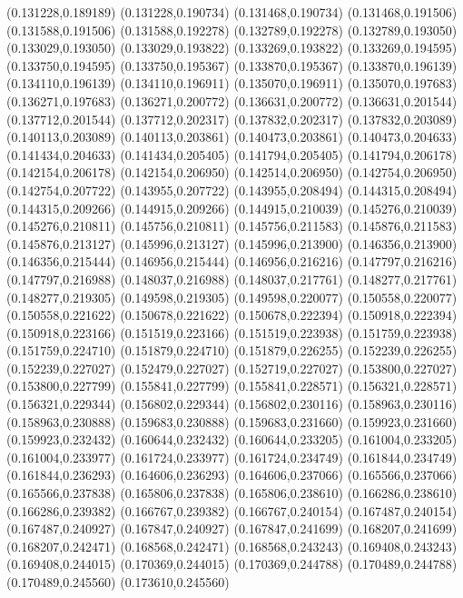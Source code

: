 (0.131228,0.189189)
(0.131228,0.190734)
(0.131468,0.190734)
(0.131468,0.191506)
(0.131588,0.191506)
(0.131588,0.192278)
(0.132789,0.192278)
(0.132789,0.193050)
(0.133029,0.193050)
(0.133029,0.193822)
(0.133269,0.193822)
(0.133269,0.194595)
(0.133750,0.194595)
(0.133750,0.195367)
(0.133870,0.195367)
(0.133870,0.196139)
(0.134110,0.196139)
(0.134110,0.196911)
(0.135070,0.196911)
(0.135070,0.197683)
(0.136271,0.197683)
(0.136271,0.200772)
(0.136631,0.200772)
(0.136631,0.201544)
(0.137712,0.201544)
(0.137712,0.202317)
(0.137832,0.202317)
(0.137832,0.203089)
(0.140113,0.203089)
(0.140113,0.203861)
(0.140473,0.203861)
(0.140473,0.204633)
(0.141434,0.204633)
(0.141434,0.205405)
(0.141794,0.205405)
(0.141794,0.206178)
(0.142154,0.206178)
(0.142154,0.206950)
(0.142514,0.206950)
(0.142754,0.206950)
(0.142754,0.207722)
(0.143955,0.207722)
(0.143955,0.208494)
(0.144315,0.208494)
(0.144315,0.209266)
(0.144915,0.209266)
(0.144915,0.210039)
(0.145276,0.210039)
(0.145276,0.210811)
(0.145756,0.210811)
(0.145756,0.211583)
(0.145876,0.211583)
(0.145876,0.213127)
(0.145996,0.213127)
(0.145996,0.213900)
(0.146356,0.213900)
(0.146356,0.215444)
(0.146956,0.215444)
(0.146956,0.216216)
(0.147797,0.216216)
(0.147797,0.216988)
(0.148037,0.216988)
(0.148037,0.217761)
(0.148277,0.217761)
(0.148277,0.219305)
(0.149598,0.219305)
(0.149598,0.220077)
(0.150558,0.220077)
(0.150558,0.221622)
(0.150678,0.221622)
(0.150678,0.222394)
(0.150918,0.222394)
(0.150918,0.223166)
(0.151519,0.223166)
(0.151519,0.223938)
(0.151759,0.223938)
(0.151759,0.224710)
(0.151879,0.224710)
(0.151879,0.226255)
(0.152239,0.226255)
(0.152239,0.227027)
(0.152479,0.227027)
(0.152719,0.227027)
(0.153800,0.227027)
(0.153800,0.227799)
(0.155841,0.227799)
(0.155841,0.228571)
(0.156321,0.228571)
(0.156321,0.229344)
(0.156802,0.229344)
(0.156802,0.230116)
(0.158963,0.230116)
(0.158963,0.230888)
(0.159683,0.230888)
(0.159683,0.231660)
(0.159923,0.231660)
(0.159923,0.232432)
(0.160644,0.232432)
(0.160644,0.233205)
(0.161004,0.233205)
(0.161004,0.233977)
(0.161724,0.233977)
(0.161724,0.234749)
(0.161844,0.234749)
(0.161844,0.236293)
(0.164606,0.236293)
(0.164606,0.237066)
(0.165566,0.237066)
(0.165566,0.237838)
(0.165806,0.237838)
(0.165806,0.238610)
(0.166286,0.238610)
(0.166286,0.239382)
(0.166767,0.239382)
(0.166767,0.240154)
(0.167487,0.240154)
(0.167487,0.240927)
(0.167847,0.240927)
(0.167847,0.241699)
(0.168207,0.241699)
(0.168207,0.242471)
(0.168568,0.242471)
(0.168568,0.243243)
(0.169408,0.243243)
(0.169408,0.244015)
(0.170369,0.244015)
(0.170369,0.244788)
(0.170489,0.244788)
(0.170489,0.245560)
(0.173610,0.245560)
